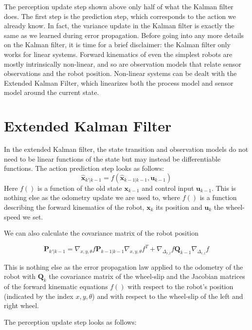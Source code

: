 The perception update step shown above only half of what the Kalman filter does. The first step is the prediction step, which corresponds to the action we already know. In fact, the variance update in the Kalman filter is exactly the same as we learned during error propagation. Before going into any more details on the Kalman filter, it is time for a brief disclaimer: the Kalman filter only works for linear systems. Forward kinematics of even the simplest robots are mostly intrinsically non-linear, and so are observation models that relate sensor observations and the robot position. Non-linear systems can be dealt with the Extended Kalman Filter, which linearizes both the process model and sensor model around the current state.

\section{Extended Kalman Filter}\label{sec:EKF}
In the extended Kalman filter, the state transition and observation models do not need to be linear functions of the state but may instead be differentiable functions. The action prediction step looks as follows:
\begin{equation}
\hat{\boldsymbol{x}}_{k'|k-1} = f(\hat{\boldsymbol{x}}_{k-1|k-1}, \boldsymbol{u}_{k-1})
\end{equation}
Here $ f()$ is a function of the old state $ \boldsymbol{x}_{k-1}$ and control input $ \boldsymbol{u}_{k-1}$. This is nothing else as the odometry update we are used to, where $ f()$ is a function describing the forward kinematics of the robot, $ \boldsymbol{x}_k$ its position and $ \boldsymbol{u}_k$ the wheel-speed we set.

We can also calculate the covariance matrix of the robot position

\begin{equation}
\boldsymbol{P}_{k'|k-1} = \nabla_{x,y,\theta}f \boldsymbol{P}_{k-1|k-1}\nabla_{x,y,\theta}f^T + \nabla_{\Delta_{r,l}}f\boldsymbol{Q}_{k-1}\nabla_{\Delta_{r,l}}f
\end{equation}

This is nothing else as the error propagation law applied to the odometry of the robot with $ \boldsymbol{Q}_k$ the covariance matrix of the wheel-slip and the Jacobian matrices of the forward kinematic equations $ f()$ with respect to the robot's position (indicated by the index $ x,y,\theta$) and with respect to the wheel-slip of the left and right wheel.

The perception update step looks as follows:

